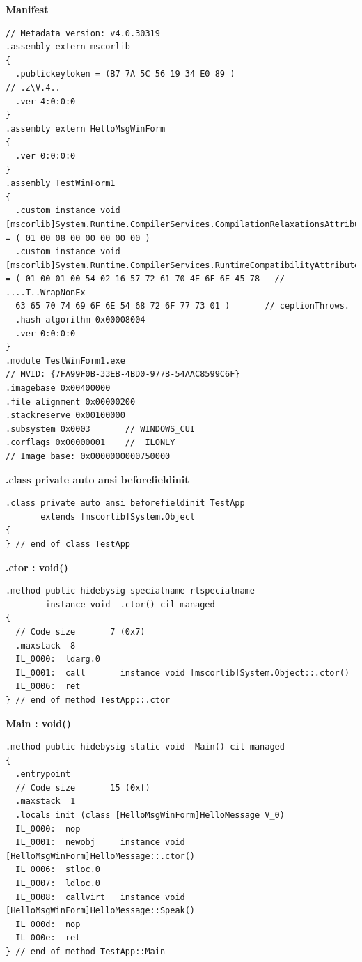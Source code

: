\textbf{Manifest}
\begin{lstlisting}[style=Csharp]
// Metadata version: v4.0.30319
.assembly extern mscorlib
{
  .publickeytoken = (B7 7A 5C 56 19 34 E0 89 )                         // .z\V.4..
  .ver 4:0:0:0
}
.assembly extern HelloMsgWinForm
{
  .ver 0:0:0:0
}
.assembly TestWinForm1
{
  .custom instance void [mscorlib]System.Runtime.CompilerServices.CompilationRelaxationsAttribute::.ctor(int32) = ( 01 00 08 00 00 00 00 00 ) 
  .custom instance void [mscorlib]System.Runtime.CompilerServices.RuntimeCompatibilityAttribute::.ctor() = ( 01 00 01 00 54 02 16 57 72 61 70 4E 6F 6E 45 78   // ....T..WrapNonEx
  63 65 70 74 69 6F 6E 54 68 72 6F 77 73 01 )       // ceptionThrows.
  .hash algorithm 0x00008004
  .ver 0:0:0:0
}
.module TestWinForm1.exe
// MVID: {7FA99F0B-33EB-4BD0-977B-54AAC8599C6F}
.imagebase 0x00400000
.file alignment 0x00000200
.stackreserve 0x00100000
.subsystem 0x0003       // WINDOWS_CUI
.corflags 0x00000001    //  ILONLY
// Image base: 0x0000000000750000
\end{lstlisting}

\textbf{.class private auto ansi beforefieldinit}
\begin{lstlisting}[style=Csharp]
.class private auto ansi beforefieldinit TestApp
       extends [mscorlib]System.Object
{
} // end of class TestApp
\end{lstlisting}

\textbf{.ctor : void()}
\begin{lstlisting}[style=Csharp]
.method public hidebysig specialname rtspecialname 
        instance void  .ctor() cil managed
{
  // Code size       7 (0x7)
  .maxstack  8
  IL_0000:  ldarg.0
  IL_0001:  call       instance void [mscorlib]System.Object::.ctor()
  IL_0006:  ret
} // end of method TestApp::.ctor
\end{lstlisting}

\textbf{Main : void()}
\begin{lstlisting}[style=Csharp]
.method public hidebysig static void  Main() cil managed
{
  .entrypoint
  // Code size       15 (0xf)
  .maxstack  1
  .locals init (class [HelloMsgWinForm]HelloMessage V_0)
  IL_0000:  nop
  IL_0001:  newobj     instance void [HelloMsgWinForm]HelloMessage::.ctor()
  IL_0006:  stloc.0
  IL_0007:  ldloc.0
  IL_0008:  callvirt   instance void [HelloMsgWinForm]HelloMessage::Speak()
  IL_000d:  nop
  IL_000e:  ret
} // end of method TestApp::Main
\end{lstlisting}